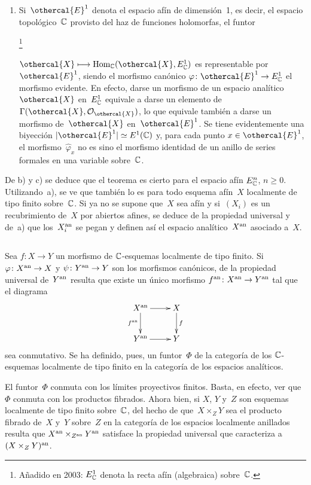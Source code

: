 \begin{enumerate}
\item[c)] Si~$\othercal{E}^1$ denota el espacio afín de dimensión~1, es
decir, el espacio topológico~$\mathbb C$ provisto del haz de funciones holomorfas,
el funtor%
{}
{{\renewcommand{\thefootnote}{*}\addtocounter{footnote}{-1}\footnote{\lcrochetbf Añadido en 2003: $E^1_\mathbb C$ denota la recta afín (algebraica) sobre~$\mathbb C$.\rcrochetbf}}}
$\othercal{X}\mto\Hom_\CC(\othercal{X},E^1_\CC)$ es representable por
$\othercal{E}^1$, siendo el morfismo canónico
$\varphi\colon\othercal{E}^1\to E^1_\CC$ el morfismo evidente. En efecto,
darse un morfismo de un espacio analítico~$\othercal{X}$ en~$E^1_\mathbb C$
equivale a darse un elemento de~$\Gamma(\othercal{X},\cal{O}_\othercal{X})$,
lo que equivale también a darse un morfismo de~$\othercal{X}$
en~$\othercal{E}^1$. Se tiene evidentemente una biyección
$|\othercal{E}^1|\simeq E^1(\CC)$ y, para cada punto
$x\in\othercal{E}^1$, el morfismo~$\widehat\varphi_x$ no es sino el
morfismo identidad de un anillo de series formales en una variable
sobre~$\mathbb C$.
\end{enumerate}

{\enlargethispage{.5cm}}%
De b) y c) se deduce que el teorema es cierto para el espacio afín
$E^n_\mathbb C$, $n\geq0$. Utilizando~a), se ve que también lo es para todo esquema
afín~$X$ localmente de tipo finito sobre~$\mathbb C$. Si ya no se supone que~$X$
sea afín y si~$(X_i)$ es un recubrimiento de~$X$ por abiertos afines, se
deduce de la propiedad universal y de~a) que los~$X_i^{\mathrm{an}}$ se pegan y definen
así el espacio analítico~$X^{\mathrm{an}}$ asociado a~$X$.

\setcounter{subsection}{1}%
\subsection{}
\label{XII.1.2}
Sea $f\colon X\to Y$ un morfismo de $\mathbb C$-esquemas localmente de tipo finito.
Si $\varphi\colon X^{\mathrm{an}}\to X$ y $\psi\colon Y^{\mathrm{an}}\to Y$ son los morfismos
canónicos, de la propiedad universal de~$Y^{\mathrm{an}}$ resulta que existe un único
morfismo $f^{\mathrm{an}}\colon X^{\mathrm{an}}\to Y^{\mathrm{an}}$ tal que el diagrama
$$
\xymatrix{
X^\an \ar[r]\ar[d]_-{f^\an}& X\ar[d]^-f\\ Y^\an \ar[r]& Y
}
$$
sea
conmutativo. Se ha definido, pues, un funtor~$\Phi$ de la categoría de los
$\mathbb C$-esquemas localmente de tipo finito en la categoría de los espacios
analíticos.

El funtor~$\Phi$ conmuta con los límites proyectivos finitos. Basta, en
efecto, ver que~$\Phi$ conmuta con los productos fibrados. Ahora bien, si
$X$, $Y$ y~$Z$ son esquemas localmente de tipo finito sobre~$\mathbb C$, del hecho
de que~$X\times_ZY$ sea el producto fibrado de~$X$ y~$Y$ sobre~$Z$ en la
categoría de los espacios localmente anillados resulta que
$X^{\mathrm{an}}\times_{Z^{\mathrm{an}}}Y^{\mathrm{an}}$ satisface la propiedad universal que caracteriza
a~$(X\times_ZY)^{\mathrm{an}}$.


